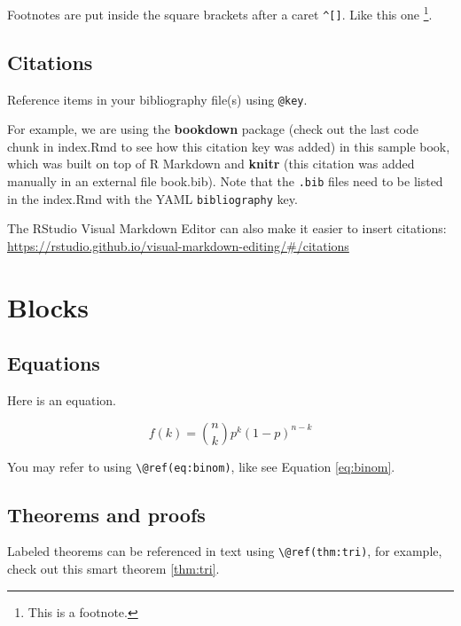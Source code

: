 \documentclass[
]{book}
\theoremstyle{definition}
\theoremstyle{definition}
\theoremstyle{definition}
\theoremstyle{definition}
\theoremstyle{remark}
\begin{document}
Footnotes are put inside the square brackets after a caret \texttt{\^{}{[}{]}}. Like this one \footnote{This is a footnote.}.

\hypertarget{citations}{%
\section{Citations}\label{citations}}

Reference items in your bibliography file(s) using \texttt{@key}.

For example, we are using the \textbf{bookdown} package \citep{R-bookdown} (check out the last code chunk in index.Rmd to see how this citation key was added) in this sample book, which was built on top of R Markdown and \textbf{knitr} \citep{xie2015} (this citation was added manually in an external file book.bib).
Note that the \texttt{.bib} files need to be listed in the index.Rmd with the YAML \texttt{bibliography} key.

The RStudio Visual Markdown Editor can also make it easier to insert citations: \url{https://rstudio.github.io/visual-markdown-editing/\#/citations}

\hypertarget{blocks}{%
\chapter{Blocks}\label{blocks}}

\hypertarget{equations}{%
\section{Equations}\label{equations}}

Here is an equation.

\begin{equation} 
  f\left(k\right) = \binom{n}{k} p^k\left(1-p\right)^{n-k}
  \label{eq:binom}
\end{equation}

You may refer to using \texttt{\textbackslash{}@ref(eq:binom)}, like see Equation \eqref{eq:binom}.

\hypertarget{theorems-and-proofs}{%
\section{Theorems and proofs}\label{theorems-and-proofs}}

Labeled theorems can be referenced in text using \texttt{\textbackslash{}@ref(thm:tri)}, for example, check out this smart theorem \ref{thm:tri}.
\end{document}
